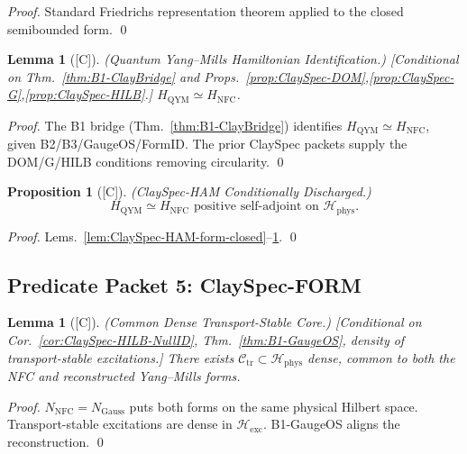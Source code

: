 \documentclass[12pt,oneside]{amsbook}
\theoremstyle{plain}
\newtheorem{lemma}[theorem]{Lemma}
\newtheorem{proposition}[theorem]{Proposition}
\theoremstyle{definition}
\theoremstyle{remark}
\newcommand{\status}[1]{\textup{[#1]}}
\begin{document}
\begin{proof}
Standard Friedrichs representation theorem applied to the closed
semibounded form.
\qed
\end{proof}

\begin{lemma}[\status{C}]\label{lem:ClaySpec-HAM-QYM-ID}
\textup{(Quantum Yang--Mills Hamiltonian Identification.)}
\textup{[Conditional on Thm.~\ref{thm:B1-ClayBridge}
and Props.~\ref{prop:ClaySpec-DOM},\ref{prop:ClaySpec-G},\ref{prop:ClaySpec-HILB}.]}
$H_{\mathrm{QYM}}\simeq H_{\mathrm{NFC}}$.
\end{lemma}

\begin{proof}
The B1 bridge (Thm.~\ref{thm:B1-ClayBridge}) identifies
$H_{\mathrm{QYM}}\simeq H_{\mathrm{NFC}}$, given B2/B3/GaugeOS/FormID.
The prior ClaySpec packets supply the DOM/G/HILB conditions
removing circularity.
\qed
\end{proof}

\begin{proposition}[\status{C}]\label{prop:ClaySpec-HAM}
\textup{(ClaySpec-HAM Conditionally Discharged.)}
\[
 \boxed{H_{\mathrm{QYM}}\simeq H_{\mathrm{NFC}}\text{ positive self-adjoint on }\mathcal{H}_{\mathrm{phys}}.}
\]
\end{proposition}

\begin{proof}
Lems.~\ref{lem:ClaySpec-HAM-form-closed}--\ref{lem:ClaySpec-HAM-QYM-ID}.
\qed
\end{proof}

\subsection{Predicate Packet 5: ClaySpec-FORM}

\begin{lemma}[\status{C}]\label{lem:ClaySpec-FORM-common-core}
\textup{(Common Dense Transport-Stable Core.)}
\textup{[Conditional on Cor.~\ref{cor:ClaySpec-HILB-NullID},
Thm.~\ref{thm:B1-GaugeOS}, density of transport-stable excitations.]}
There exists $\mathcal{C}_{\mathrm{tr}}\subset\mathcal{H}_{\mathrm{phys}}$
dense, common to both the NFC and reconstructed Yang--Mills forms.
\end{lemma}

\begin{proof}
$N_{\mathrm{NFC}}=N_{\mathrm{Gauss}}$ puts both forms on the same
physical Hilbert space. Transport-stable excitations are dense in
$\mathcal{H}_{\mathrm{exc}}$. B1-GaugeOS aligns the reconstruction.
\qed
\end{proof}
\end{document}
